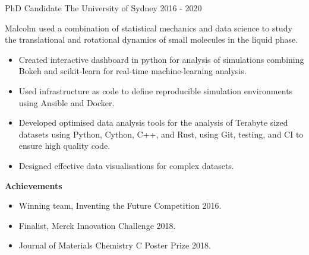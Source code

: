 
\begin{cventries}

\cventry
  {PhD Candidate} %
  {The University of Sydney} %
  {} %
  {2016 - 2020} %
{%
  Malcolm used a combination of statistical mechanics and data science to
  study the translational and rotational dynamics
  of small molecules in the liquid phase.
  \begin{itemize}
    \item Created interactive dashboard in python for analysis of simulations
      combining Bokeh and scikit-learn for real-time machine-learning analysis.
    \item Used infrastructure as code to define reproducible simulation environments
      using Ansible and Docker.
    \item Developed optimised data analysis tools for the analysis of Terabyte sized
      datasets using Python, Cython, C++, and Rust,
      using Git, testing, and CI to ensure high quality code.
    \item Designed effective data visualisations for complex datasets.
  \end{itemize}
  \textbf{Achievements}
  \begin{itemize}
    \item Winning team, Inventing the Future Competition 2016.
    \item Finalist, Merck Innovation Challenge 2018.
    \item Journal of Materials Chemistry C Poster Prize 2018.
  \end{itemize}
}

\end{cventries}
